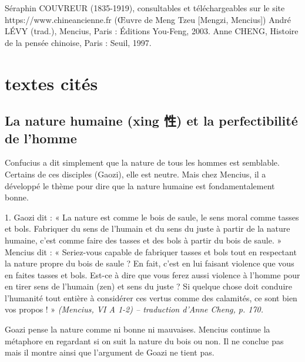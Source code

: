 Séraphin	COUVREUR	(1835-1919),	consultables	et	téléchargeables	sur	le	site https://www.chineancienne.fr (Œuvre de Meng Tzeu [Mengzi, Mencius])
André LÉVY (trad.), Mencius, Paris : Éditions You-Feng, 2003. Anne CHENG, Histoire de la pensée chinoise, Paris : Seuil, 1997.


\section{textes cités}

\subsection{La nature humaine (xing 性) et la perfectibilité de l’homme}

Confucius a dit simplement que la nature de tous les hommes est semblable. Certains de ces disciples (Gaozi), elle est neutre. Mais chez Mencius, il a développé le thème pour dire que la nature humaine est fondamentalement bonne. 


\begin{singlequote}
    1.	Gaozi dit : « La nature est comme le bois de saule, le sens moral comme tasses et bols. Fabriquer du sens de l’humain et du sens du juste à partir de la nature humaine, c’est comme faire des tasses et des bols à partir du bois de saule. »
Mencius dit : « Seriez-vous capable de fabriquer tasses et bols tout en respectant la nature propre du bois de saule ? En fait, c’est en lui faisant violence que vous en faites tasses et bols. Est-ce à dire que vous ferez aussi violence à l’homme pour en tirer sens de l’humain (zen) et sens du juste ? Si quelque chose doit conduire l’humanité tout entière à considérer ces vertus comme des calamités, ce sont bien vos propos ! » 
 \textit{\small (Mencius, VI A 1-2)
-- traduction d’Anne Cheng, p. 170.}
\end{singlequote}

Goazi pense la nature comme ni bonne ni mauvaises. Mencius continue la métaphore en regardant si on suit la nature du bois ou non. Il ne conclue pas mais il montre ainsi que l'argument de Goazi ne tient pas.


